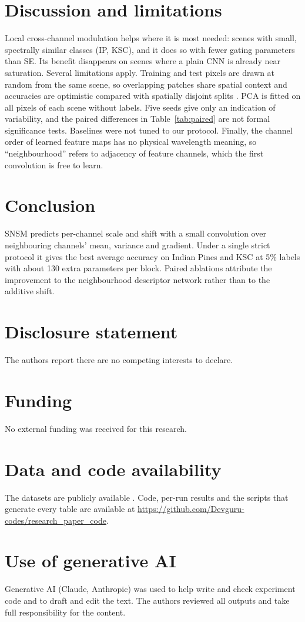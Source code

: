 \documentclass[]{interact}
\begin{document}
\section{Discussion and limitations}
Local cross-channel modulation helps where it is most needed: scenes with small, spectrally similar classes (IP, KSC), and it does so with fewer gating parameters than SE. Its benefit disappears on scenes where a plain CNN is already near saturation. Several limitations apply. Training and test pixels are drawn at random from the same scene, so overlapping patches share spatial context and accuracies are optimistic compared with spatially disjoint splits \citep{liang2017sampling,nalepa2019validating}. PCA is fitted on all pixels of each scene without labels. Five seeds give only an indication of variability, and the paired differences in Table~\ref{tab:paired} are not formal significance tests. Baselines were not tuned to our protocol. Finally, the channel order of learned feature maps has no physical wavelength meaning, so ``neighbourhood'' refers to adjacency of feature channels, which the first convolution is free to learn.

\section{Conclusion}
SNSM predicts per-channel scale and shift with a small convolution over neighbouring channels' mean, variance and gradient. Under a single strict protocol it gives the best average accuracy on Indian Pines and KSC at 5\% labels with about 130 extra parameters per block. Paired ablations attribute the improvement to the neighbourhood descriptor network rather than to the additive shift.

\section*{Disclosure statement}
The authors report there are no competing interests to declare.

\section*{Funding}
No external funding was received for this research.

\section*{Data and code availability}
The datasets are publicly available \citep{gic2020hyperspectral,zhong2020whu}. Code, per-run results and the scripts that generate every table are available at \url{https://github.com/Devguru-codes/research_paper_code}.

\section*{Use of generative AI}
Generative AI (Claude, Anthropic) was used to help write and check experiment code and to draft and edit the text. The authors reviewed all outputs and take full responsibility for the content.



\end{document}

